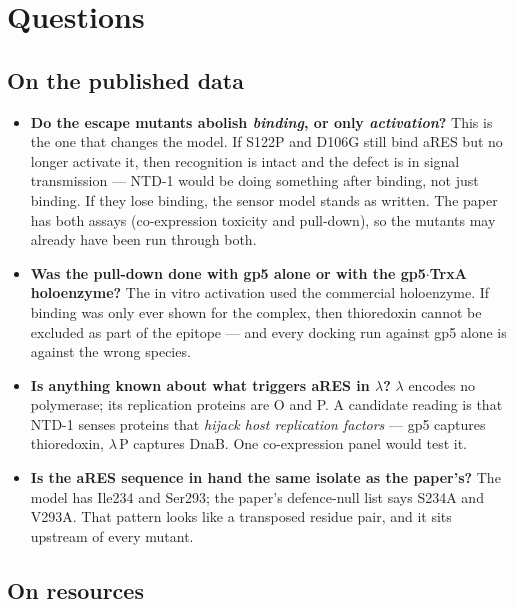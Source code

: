 \documentclass[11pt,a4paper]{article}
\begin{document}
\section{Questions}

\subsection*{On the published data}

\begin{itemize}[leftmargin=1.4em,itemsep=2pt,label=$\square$]
  \item \textbf{Do the escape mutants abolish \emph{binding}, or only \emph{activation}?}
        This is the one that changes the model. If S122P and D106G still bind aRES but no longer
        activate it, then recognition is intact and the defect is in signal transmission --- NTD-1
        would be doing something after binding, not just binding. If they lose binding, the sensor
        model stands as written. The paper has both assays (co-expression toxicity and pull-down),
        so the mutants may already have been run through both.
  \item \textbf{Was the pull-down done with gp5 alone or with the gp5$\cdot$TrxA holoenzyme?}
        The in vitro activation used the commercial holoenzyme. If binding was only ever shown for
        the complex, then thioredoxin cannot be excluded as part of the epitope --- and every
        docking run against gp5 alone is against the wrong species.
  \item \textbf{Is anything known about what triggers aRES in $\lambda$?} $\lambda$ encodes no
        polymerase; its replication proteins are O and P. A candidate reading is that NTD-1 senses
        proteins that \emph{hijack host replication factors} --- gp5 captures thioredoxin, $\lambda$\,P
        captures DnaB. One co-expression panel would test it.
  \item \textbf{Is the aRES sequence in hand the same isolate as the paper's?} The model has Ile234
        and Ser293; the paper's defence-null list says S234A and V293A. That pattern looks like a
        transposed residue pair, and it sits upstream of every mutant.
\end{itemize}

\subsection*{On resources}
\end{document}
